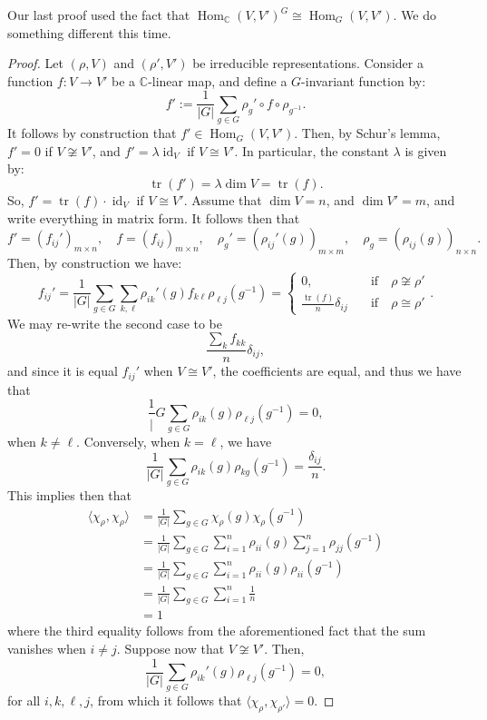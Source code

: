 \documentclass[a4paper]{report}
\theoremstyle{definition}
\theoremstyle{remark}
\theoremstyle{proposition}
\theoremstyle{conjecture}
\theoremstyle{lemma}
\theoremstyle{corollary}
\theoremstyle{exercise}
\theoremstyle{example}
\newcommand{\C}{\mathbb{C}}
\newcommand{\on}{\operatorname}
\begin{document}
Our last proof used the fact that $\on{Hom}_\C(V,V')^G \cong \on{Hom}_G(V,V')$.
We do something different this time.
\begin{proof}
    Let $(\rho,V)$ and $(\rho',V')$ be irreducible representations.
    Consider a function $f : V \to V'$ be a $\C$-linear map, and 
    define a $G$-invariant function by:
    $$f' := \frac{1}{\vert G \vert} \sum_{g \in G} \rho_g'\circ f \circ \rho_{g^{-1}}.$$
    It follows by construction that $f' \in \on{Hom}_G(V,V')$. Then, by 
    Schur's lemma, $f' = 0$ if $V\not\cong V'$, and $f' = \lambda \on{id}_V$
    if $V \cong V'$. In particular, the constant $\lambda$ is given by:
    $$\on{tr}(f') = \lambda \dim V = \on{tr}(f).$$
    So, $f' = \on{tr}(f) \cdot\on{id}_V$ if $V\cong V'$. 
    Assume that $\dim V = n$, and $\dim V' = m$, and write everything in matrix
    form. It follows then that $$f ' = (f_{ij}')_{m\times n}, \quad f = (f_{ij})_{m\times n},\quad \rho_g' = (\rho_{ij}'(g))_{m\times m}, \quad \rho_g = (\rho_{ij}(g))_{n\times n}.$$
    Then, by construction we have: 
    $$f_{ij}' = \frac{1}{\vert G \vert} \sum_{g \in G} \sum_{k,\ell} \rho_{ik}'(g) f_{k\ell} \rho_{\ell j}(g^{-1}) = \begin{cases}
        0,\quad &\text{if} \quad \rho\not\cong \rho'\\
        \frac{\on{tr}(f)}{n}\delta_{ij} \quad &\text{if}\quad \rho\cong\rho'
    \end{cases}.$$
    We may re-write the second case to be 
    $$\frac{\sum_kf_{kk}}{n}\delta_{ij},$$
    and since it is equal $f_{ij}'$ when $V\cong V'$, the coefficients are equal,
    and thus we have that 
    $$\frac{1}\vert{G} \sum_{g\in G} \rho_{ik}(g)\rho_{\ell j}(g^{-1}) = 0,$$
    when $k \neq \ell$. 
    Conversely, when $k=\ell$, we have 
    $$\frac{1}{\vert G\vert} \sum_{g\in G} \rho_{ik}(g) \rho_{kg}(g^{-1}) = \frac{\delta_{ij}}{n}.$$
    This implies then that 
    \begin{align*}
        \langle\chi_\rho,\chi_\rho\rangle &= \frac{1}{\vert G\vert}\sum_{g \in G}
        \chi_\rho(g)\chi_\rho(g^{-1}) \\
                                          &= \frac{1}{\vert G \vert} \sum_{g\in G}\sum_{i=1}^n \rho_{ii}(g) \sum_{j=1}^n\rho_{jj}(g^{-1})\\
                                          &=\frac{1}{\vert G \vert} \sum_{g\in G} \sum_{i=1}^n\rho_{ii}(g)\rho_{ii}(g^{-1})\\
                                          &= \frac{1}{\vert G\vert}\sum_{g\in G}\sum_{i=1}^n\frac{1}{n}\\
                                          &=1
    \end{align*}
    where the third equality follows from the aforementioned fact that the 
    sum vanishes when $i \neq j$. Suppose now that $V\not\cong V'$.
    Then, 
    $$\frac{1}{\vert G \vert} \sum_{g\in G} \rho_{ik}'(g)\rho_{\ell j}(g^{-1}) = 0,$$
    for all $i,k,\ell,j$,
    from which it follows that $\langle\chi_\rho,\chi_{\rho'}\rangle = 0$.
\end{proof}
\end{document}
